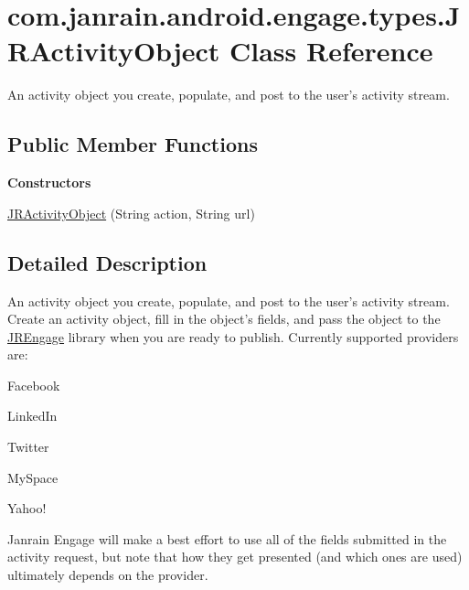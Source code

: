 \hypertarget{classcom_1_1janrain_1_1android_1_1engage_1_1types_1_1_j_r_activity_object}{
\section{com.janrain.android.engage.types.JRActivityObject Class Reference}
\label{classcom_1_1janrain_1_1android_1_1engage_1_1types_1_1_j_r_activity_object}
}


An activity object you create, populate, and post to the user's activity stream.  


\subsection*{Public Member Functions}
\begin{Indent}{\bf Constructors}\par
{\em \label{_amgrp559a25fdb98a7d1fd1c3771ac568d5e9}
 }\begin{DoxyCompactItemize}
\item 
\hyperlink{classcom_1_1janrain_1_1android_1_1engage_1_1types_1_1_j_r_activity_object_a625c1c83258dc53f0f5c5531c79db3b9}{JRActivityObject} (String action, String url)
\end{DoxyCompactItemize}
\end{Indent}


\subsection{Detailed Description}
An activity object you create, populate, and post to the user's activity stream. Create an activity object, fill in the object's fields, and pass the object to the \hyperlink{classcom_1_1janrain_1_1android_1_1engage_1_1_j_r_engage}{JREngage} library when you are ready to publish. Currently supported providers are:
\begin{DoxyItemize}
\item Facebook
\item LinkedIn
\item Twitter
\item MySpace
\item Yahoo!
\end{DoxyItemize}

Janrain Engage will make a best effort to use all of the fields submitted in the activity request, but note that how they get presented (and which ones are used) ultimately depends on the provider.

